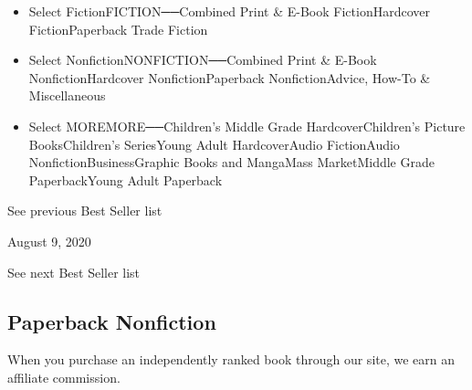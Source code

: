 \begin{itemize}
\tightlist
\item
  Select FictionFICTION──Combined Print \& E-Book FictionHardcover
  FictionPaperback Trade Fiction
\item
  Select NonfictionNONFICTION──Combined Print \& E-Book
  NonfictionHardcover NonfictionPaperback NonfictionAdvice, How-To \&
  Miscellaneous
\item
  Select MOREMORE──Children's Middle Grade HardcoverChildren's Picture
  BooksChildren's SeriesYoung Adult HardcoverAudio FictionAudio
  NonfictionBusinessGraphic Books and MangaMass MarketMiddle Grade
  PaperbackYoung Adult Paperback
\end{itemize}

\href{/books/best-sellers/2020/08/02/paperback-nonfiction/}{}

See previous Best Seller list

August 9, 2020

See next Best Seller list

\hypertarget{paperback-nonfiction}{%
\subsection{Paperback Nonfiction}\label{paperback-nonfiction}}

When you purchase an independently ranked book through our site, we earn
an affiliate commission.


